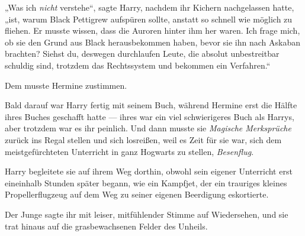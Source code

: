 „Was ich \emph{nicht} verstehe“, sagte Harry, nachdem ihr Kichern nachgelassen hatte, „ist, warum Black Pettigrew aufspüren sollte, anstatt so schnell wie möglich zu fliehen. Er musste wissen, dass die Auroren hinter ihm her waren. Ich frage mich, ob sie den Grund aus Black herausbekommen haben, bevor sie ihn nach Askaban brachten? Siehst du, deswegen durchlaufen Leute, die absolut unbestreitbar schuldig sind, trotzdem das Rechtssystem und bekommen ein Verfahren.“

Dem musste Hermine zustimmen.

Bald darauf war Harry fertig mit seinem Buch, während Hermine erst die Hälfte ihres Buches geschafft hatte — ihres war ein viel schwierigeres Buch als Harrys, aber trotzdem war es ihr peinlich. Und dann musste sie \emph{Magische Merksprüche} zurück ins Regal stellen und sich losreißen, weil es Zeit für sie war, sich dem meistgefürchteten Unterricht in ganz Hogwarts zu stellen, \emph{Besenflug}.

Harry begleitete sie auf ihrem Weg dorthin, obwohl sein eigener Unterricht erst eineinhalb Stunden später begann, wie ein Kampfjet, der ein trauriges kleines Propellerflugzeug auf dem Weg zu seiner eigenen Beerdigung eskortierte.

Der Junge sagte ihr mit leiser, mitfühlender Stimme auf Wiedersehen, und sie trat hinaus auf die grasbewachsenen Felder des Unheils.

